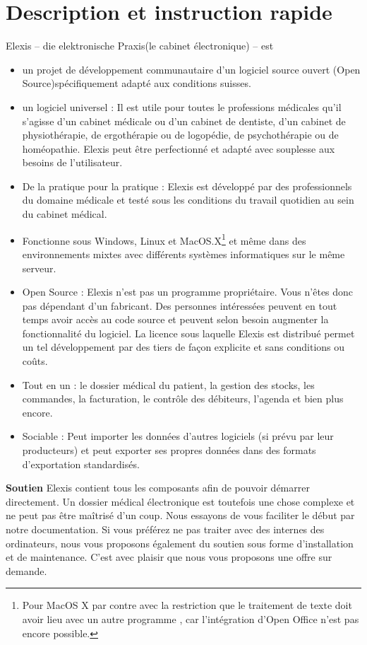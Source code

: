 \documentclass[paper=a4,BCOR8.25mm,twoside]{scrbook}
\begin{document}
\chapter{Description et instruction rapide}
Elexis -- die elektronische Praxis(le cabinet électronique) -- est
\begin{itemize}
	\item un projet de développement communautaire d'un logiciel source ouvert (Open Source)spécifiquement adapté aux conditions suisses.

	\item  un logiciel universel : Il est utile pour toutes le professions médicales qu'il s'agisse d'un cabinet médicale ou d'un cabinet de dentiste, d'un cabinet de physiothérapie, de ergothérapie ou de logopédie, de psychothérapie ou de homéopathie. Elexis peut être perfectionné et adapté avec souplesse aux besoins de l'utilisateur.
	\item De la pratique pour la pratique : Elexis est développé par des professionnels du domaine médicale et testé sous les conditions du travail quotidien au sein du cabinet médical.

	\item Fonctionne sous Windows, Linux et MacOS.X\footnote{Pour MacOS X par contre avec la restriction que le traitement de texte doit avoir lieu avec un autre programme , car l'intégration d'Open Office n'est pas encore possible.} et même dans des environnements mixtes avec différents systèmes informatiques sur le même serveur. 
	\item Open Source : Elexis n'est pas un programme propriétaire. Vous n'êtes donc pas dépendant d'un fabricant. Des personnes intéressées peuvent en tout temps avoir accès au code source et peuvent selon besoin augmenter la fonctionnalité du logiciel. La licence sous laquelle Elexis est distribué permet un tel développement par des tiers de façon explicite et sans conditions ou coûts.

	\item Tout en un : le dossier médical du patient, la gestion des stocks, les commandes, la facturation, le contrôle des débiteurs, l'agenda et bien plus encore.
  	\item Sociable : Peut importer les données d'autres logiciels (si prévu par leur producteurs) et peut exporter ses propres données dans des formats d'exportation standardisés.
\end{itemize}
\pagebreak[3]
\textbf{Soutien}
Elexis contient tous les composants afin de pouvoir démarrer directement. Un dossier médical électronique est toutefois une chose complexe et ne peut pas être maîtrisé d'un coup.
Nous essayons de vous faciliter le début par notre documentation. Si vous préférez ne pas traiter avec des internes des ordinateurs, nous vous proposons également du soutien sous forme d'installation et de maintenance. C'est avec plaisir que nous vous proposons une offre sur demande.
\end{document}
